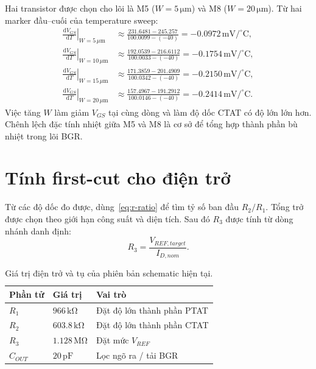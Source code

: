 \documentclass[11pt,a4paper]{report}
\newcommand{\SI}[2]{\ensuremath{#1\,\mathrm{#2}}}
\newcommand{\micro}{\mu}
\newcommand{\dd}{\mathrm d}
\newcommand{\ohm}{\Omega}
\newcommand{\RoneFinal}{\SI{966}{k\ohm}}
\newcommand{\RtwoFinal}{\SI{603.8}{k\ohm}}
\newcommand{\RthreeFinal}{\SI{1.128}{M\ohm}}
\newcommand{\CoutFinal}{\SI{20}{pF}}
\begin{document}
Hai transistor được chọn cho lõi là M5 ($W=\SI{5}{\micro m}$) và M8
($W=\SI{20}{\micro m}$). Từ hai marker đầu--cuối của temperature sweep:
\begin{align}
\left.\frac{\dd V_{GS}}{\dd T}\right|_{W=5\,\micro\mathrm m}
&\approx\frac{231.6481-245.257}{100.0099-(-40)}
=-\SI{0.0972}{mV/^{\circ}C},\\
\left.\frac{\dd V_{GS}}{\dd T}\right|_{W=10\,\micro\mathrm m}
&\approx\frac{192.0539-216.6112}{100.0033-(-40)}
=-\SI{0.1754}{mV/^{\circ}C},\\
\left.\frac{\dd V_{GS}}{\dd T}\right|_{W=15\,\micro\mathrm m}
&\approx\frac{171.3859-201.4909}{100.0342-(-40)}
=-\SI{0.2150}{mV/^{\circ}C},\\
\left.\frac{\dd V_{GS}}{\dd T}\right|_{W=20\,\micro\mathrm m}
&\approx\frac{157.4967-191.2912}{100.0146-(-40)}
=-\SI{0.2414}{mV/^{\circ}C}.
\end{align}
Việc tăng $W$ làm giảm $V_{GS}$ tại cùng dòng và làm độ dốc CTAT có độ lớn
lớn hơn. Chênh lệch đặc tính nhiệt giữa M5 và M8 là cơ sở để tổng hợp thành
phần bù nhiệt trong lõi BGR.

\section{Tính first-cut cho điện trở}
Từ các độ dốc đo được, dùng~\eqref{eq:r-ratio} để tìm tỷ số ban đầu
$R_2/R_1$. Tổng trở được chọn theo giới hạn công suất và diện tích. Sau đó
$R_3$ được tính từ dòng nhánh danh định:
\begin{equation}
R_3=\frac{V_{REF,target}}{I_{D,nom}}.
\label{eq:r3}
\end{equation}

\begin{table}[H]
\centering
\caption{Giá trị điện trở và tụ của phiên bản schematic hiện tại.}
\begin{tabular}{lll}
\toprule
Phần tử&Giá trị&Vai trò\\
\midrule
$R_1$&\RoneFinal&Đặt độ lớn thành phần PTAT\\
$R_2$&\RtwoFinal&Đặt độ lớn thành phần CTAT\\
$R_3$&\RthreeFinal&Đặt mức $V_{REF}$\\
$C_{OUT}$&\CoutFinal&Lọc ngõ ra / tải BGR\\
\bottomrule
\end{tabular}
\end{table}
\end{document}
